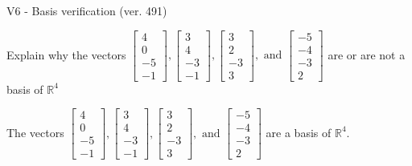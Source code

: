 \begin{exercise}
  \begin{exerciseTitle}V6 - Basis verification (ver. 491)\end{exerciseTitle}
  \begin{exerciseStatement}
    Explain why the vectors \(\left[\begin{array}{r}
4 \\
0 \\
-5 \\
-1
\end{array}\right] , \left[\begin{array}{r}
3 \\
4 \\
-3 \\
-1
\end{array}\right] , \left[\begin{array}{r}
3 \\
2 \\
-3 \\
3
\end{array}\right] , \text{ and } \left[\begin{array}{r}
-5 \\
-4 \\
-3 \\
2
\end{array}\right]\) are or are not a basis of \(\mathbb{R}^4\)	


  \end{exerciseStatement}
  \begin{exerciseAnswer}
   The vectors \(\left[\begin{array}{r}
4 \\
0 \\
-5 \\
-1
\end{array}\right] , \left[\begin{array}{r}
3 \\
4 \\
-3 \\
-1
\end{array}\right] , \left[\begin{array}{r}
3 \\
2 \\
-3 \\
3
\end{array}\right] , \text{ and } \left[\begin{array}{r}
-5 \\
-4 \\
-3 \\
2
\end{array}\right]\) 
  	 are  a basis of \(\mathbb{R}^4\).
  


  \end{exerciseAnswer}
\end{exercise}
